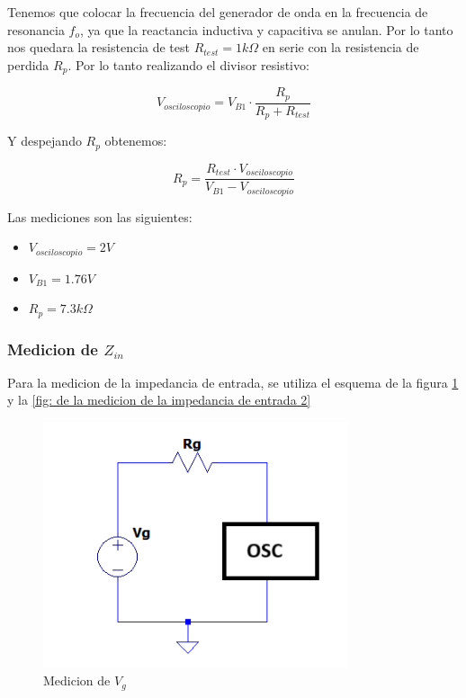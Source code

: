 Tenemos que colocar la frecuencia del generador de onda en la frecuencia de resonancia $f_o$, ya que la reactancia inductiva y capacitiva se anulan.
Por lo tanto nos quedara la resistencia de test $R_{test} = 1k\Omega$ en serie con la resistencia de perdida $R_p$. Por lo tanto realizando el divisor resistivo:

\begin{equation}
    V_{osciloscopio} = V_{B1} \cdot \frac{R_p}{R_p + R_{test}}
\end{equation}

Y despejando $R_p$ obtenemos:

\begin{equation}
    R_p = \frac{R_{test} \cdot V_{osciloscopio}}{V_{B1} - V_{osciloscopio}}
\end{equation}

Las mediciones son las siguientes:
\begin{itemize}
    \item $V_{osciloscopio} = 2 V$
    \item $V_{B1} = 1.76 V$
    \item $R_p = 7.3 k\Omega$
\end{itemize}

\subsubsection{Medicion de $Z_{in}$}

Para la medicion de la impedancia de entrada, se utiliza el esquema de la figura \ref{fig: de la medicion de la impedancia de entrada}
y la \ref{fig: de la medicion de la impedancia de entrada 2}

\begin{figure}[h]
    \centering
    \includegraphics[width=0.8\textwidth]{Imagenes/medicion_zin1.png}
    \caption{Medicion de $V_g$}
    \label{fig: de la medicion de la impedancia de entrada}
\end{figure}

